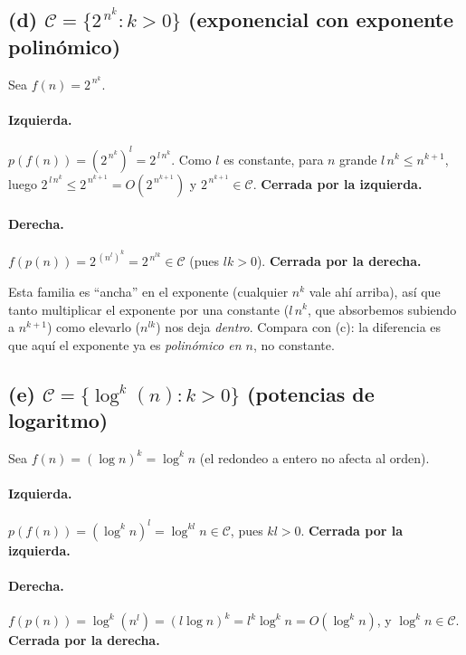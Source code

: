 \documentclass[11pt,a4paper]{article}
\theoremstyle{plain}
\theoremstyle{definition}
\begin{document}
\subsection*{(d) $\mathcal{C}=\{2^{\,n^{k}}: k>0\}$ (exponencial con exponente polin\'omico)}

Sea $f(n)=2^{\,n^{k}}$.
\paragraph{Izquierda.} $p(f(n)) = (2^{\,n^{k}})^{l} = 2^{\,l\,n^{k}}$. Como $l$ es
constante, para $n$ grande $l\,n^{k}\leq n^{k+1}$, luego
$2^{\,l\,n^{k}} \leq 2^{\,n^{k+1}}=O(2^{\,n^{k+1}})$ y $2^{\,n^{k+1}}\in\mathcal{C}$.
\textbf{Cerrada por la izquierda.}
\paragraph{Derecha.} $f(p(n)) = 2^{\,(n^{l})^{k}} = 2^{\,n^{lk}}\in\mathcal{C}$
(pues $lk>0$). \textbf{Cerrada por la derecha.}
\medskip\noindent{}

\begin{porque}
Esta familia es ``ancha'' en el exponente (cualquier $n^k$ vale ah\'i arriba), as\'i
que tanto multiplicar el exponente por una constante ($l\,n^k$, que absorbemos subiendo
a $n^{k+1}$) como elevarlo ($n^{lk}$) nos deja \emph{dentro}. Compara con (c): la
diferencia es que aqu\'i el exponente ya es \emph{polin\'omico en $n$}, no constante.
\end{porque}

\subsection*{(e) $\mathcal{C}=\{\log^{k}(n): k>0\}$ (potencias de logaritmo)}

Sea $f(n)=(\log n)^{k}=\log^{k} n$ (el redondeo a entero no afecta al orden).
\paragraph{Izquierda.} $p(f(n)) = (\log^{k} n)^{l} = \log^{kl} n\in\mathcal{C}$, pues
$kl>0$. \textbf{Cerrada por la izquierda.}
\paragraph{Derecha.} $f(p(n)) = \log^{k}(n^{l}) = (l\log n)^{k} = l^{k}\log^{k} n
= O(\log^{k} n)$, y $\log^{k} n\in\mathcal{C}$. \textbf{Cerrada por la derecha.}
\medskip\noindent{}
\end{document}
